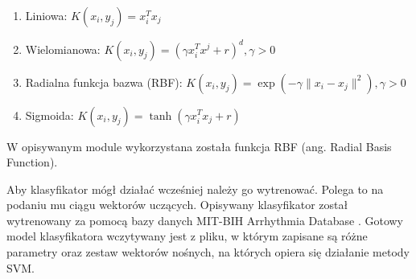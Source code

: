 \begin{enumerate}
	\item Liniowa: $K\left(x_i,y_j\right)=x_i^Tx_j$
	\item Wielomianowa: $K\left(x_i,y_j\right)=\left(\gamma x_i^Tx^j+r\right)^d, \gamma > 0$
	\item Radialna funkcja bazwa (RBF): $K\left(x_i,y_j\right)=\exp{\left(-\gamma \|x_i-x_j\|^2\right)}, \gamma > 0$
	\item Sigmoida: $K\left(x_i,y_j\right)=\tanh{\left(\gamma x_i^Tx_j+r\right)}$
\end{enumerate}

W opisywanym module wykorzystana została funkcja RBF (ang. Radial Basis Function). 

Aby klasyfikator mógł działać wcześniej należy go wytrenować. Polega to na podaniu mu ciągu wektorów uczących. Opisywany klasyfikator został wytrenowany za pomocą bazy danych MIT-BIH Arrhythmia Database \cite{MITDB}. Gotowy model klasyfikatora wczytywany jest z pliku, w którym zapisane są różne parametry oraz zestaw wektorów nośnych, na których opiera się działanie metody SVM.
